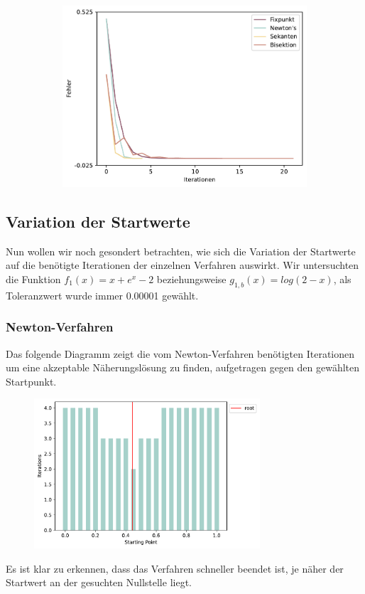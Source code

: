 \documentclass[a4paper,12pt]{article}
\newcommand{\1}{1\hspace{-0,9ex}1}
\begin{document}
\begin{figure}[!h]
\begin{subfigure}[b]{0.4\textwidth}
		\includegraphics[width=\textwidth]{plots/error_series_plot(4).pdf}
	\end{subfigure}
\end{figure}
\subsection*{Variation der Startwerte}
Nun wollen wir noch gesondert betrachten, wie sich die Variation der Startwerte auf die benötigte Iterationen der einzelnen Verfahren auswirkt. Wir untersuchten die Funktion $f_1(x)=x+e^x-2$ beziehungsweise $g_{1,b}(x)=log(2-x)$, als Toleranzwert wurde immer 0.00001 gewählt.
\subsubsection*{Newton-Verfahren}
Das folgende Diagramm zeigt die vom Newton-Verfahren benötigten Iterationen um eine akzeptable Näherungslösung zu finden, aufgetragen gegen den gewählten Startpunkt.
\begin{figure}[!h]
	\centering
	\includegraphics[width=0.75\textwidth]{plots/newton_iterations_by_starting_point.pdf}
\end{figure}
Es ist klar zu erkennen, dass das Verfahren schneller beendet ist, je näher der Startwert an der gesuchten Nullstelle liegt.
\end{document}
